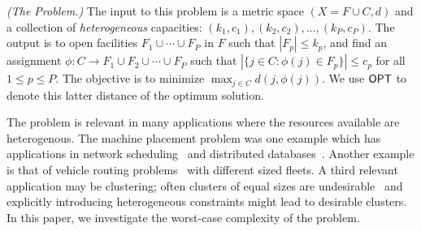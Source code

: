 \begin{definition}\emph{(The \mckc Problem.)}
The input to this problem is a metric space $(X = F\cup C,d)$  %
and  a collection of {\em heterogeneous} capacities: $(k_1,c_1), (k_2,c_2),\ldots, (k_P,c_P)$.
The output is to open facilities $F_1 \cup  \cdots \cup F_P$ in $F$ such that $|F_p|\le k_p$, and find an assignment $\phi:C\to F_1\cup F_2\cup \cdots \cup F_P$ such that $|\{j\in C: \phi(j)\in F_p\}|\leq c_p$ for all $1\le p \le P$.
The objective is to minimize $\max_{j\in C} d(j,\phi(j))$.
%
We use $\mathsf{OPT}$ to denote this latter distance of the optimum solution. 
\end{definition}
\noindent
The \mckc problem is relevant in many applications where the resources available are heterogenous. The machine placement problem was one example which has applications in network scheduling~\cite{bibid} and distributed databases~\cite{morgan-levin,sen-krishnamoorthy-rangaraj}. Another example is that of  vehicle routing problems~\cite{bibid} with different sized fleets. A third relevant application may be clustering; often clusters of equal sizes are undesirable~\cite{see icalp paper} and explicitly introducing heterogeneous constraints might lead to desirable clusters.
In this paper, we investigate the worst-case complexity of the problem. \smallskip

